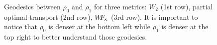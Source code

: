 \begin{figure}
{\begin{tikzpicture}
\end{tikzpicture}
        }
\caption{Geodesics between $\rho_0$ and $\rho_1$ for three metrics: $W_2$ (1st row), partial optimal transport (2nd row),  $\WF_{\kappa}$ (3rd row). It is important to notice that $\rho_0$ is denser at the bottom left while $\rho_1$ is denser at the top right to better understand those geodesics.}
\label{fig: synthetic rho distance}
\end{figure}


\begin{figure}[ht]
 \centering
\end{figure}
